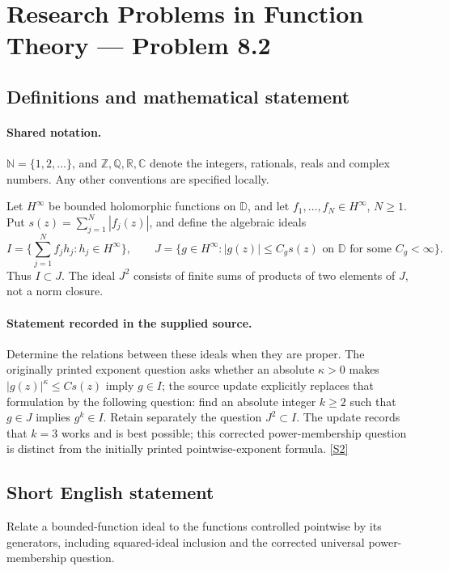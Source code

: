 \documentclass[11pt]{article}
\newcommand{\sref}[2]{\hyperlink{source:#1:#2}{[S#2]}}
\begin{document}
\section{Research Problems in Function Theory — Problem 8.2}\label{statement}

\subsection{Definitions and mathematical statement}

\paragraph{Shared notation.}$\mathbb N=\{1,2,\ldots\}$, and $\mathbb Z,\mathbb Q,\mathbb R,\mathbb C$ denote the integers, rationals, reals and complex numbers. Any other conventions are specified locally.


Let $H^\infty$ be bounded holomorphic functions on $\mathbb D$, and let $f_1,\ldots,f_N\in H^\infty$, $N\ge1$. Put $s(z)=\sum_{j=1}^N|f_j(z)|$, and define the algebraic ideals
\[I=\{\sum_{j=1}^Nf_jh_j:h_j\in H^\infty\},\qquad
J=\{g\in H^\infty: |g(z)|\le C_gs(z)\text{ on }\mathbb D
\text{ for some }C_g<\infty\}.
\]
Thus $I\subset J$. The ideal $J^2$ consists of finite sums of products of two elements of $J$, not a norm closure.
\paragraph{Statement recorded in the supplied source.}
Determine the relations between these ideals when they are proper. The originally printed exponent question asks whether an absolute $\kappa>0$ makes $|g(z)|^\kappa\le C s(z)$ imply $g\in I$; the source update explicitly replaces that formulation by the following question: find an absolute integer $k\ge2$ such that $g\in J$ implies $g^k\in I$. Retain separately the question $J^2\subset I$. The update records that $k=3$ works and is best possible; this corrected power-membership question is distinct from the initially printed pointwise-exponent formula. \sref{statement}{2}
\subsection{Short English statement}
Relate a bounded-function ideal to the functions controlled pointwise by its generators, including squared-ideal inclusion and the corrected universal power-membership question.
\end{document}
